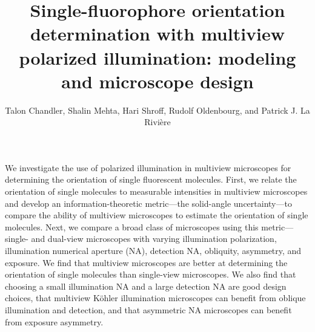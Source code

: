 \documentclass[10pt]{article}
\begin{document}
\title{Single-fluorophore orientation determination with multiview polarized
  illumination: modeling and microscope design}

\author{Talon Chandler, Shalin Mehta, Hari Shroff, Rudolf Oldenbourg, and Patrick J. La Rivi\`ere}
\address{University of Chicago, Department of Radiology, Chicago, Illinois 60637, USA\\
  Marine Biological Laboratory, Bell Center, Woods Hole, Massachusetts, USA\\
  Section on High Resolution Optical Imaging, National Institute
  of Biomedical Imaging and Bioengineering, National Institutes of Health,
  Bethesda, Maryland 20892, USA\\
  Whitman Center, Marine Biological Laboratory, Woods Hole,
  Massachusetts 02543, USA\\
  Brown University, Department of Physics, Providence, Rhode
  Island 02912, USA}

\begin{abstract*}
  We investigate the use of polarized illumination in multiview microscopes for
  determining the orientation of single fluorescent molecules. First, we relate
  the orientation of single molecules to measurable intensities in multiview
  microscopes and develop an information-theoretic metric---the solid-angle
  uncertainty---to compare the ability of multiview microscopes to estimate the
  orientation of single molecules. Next, we compare a broad class of microscopes
  using this metric---single- and dual-view microscopes with varying
  illumination polarization, illumination numerical aperture (NA), detection NA,
  obliquity, asymmetry, and exposure. We find that multiview microscopes are
  better at determining the orientation of single molecules than single-view
  microscopes. We also find that choosing a small illumination NA and a large
  detection NA are good design choices, that multiview K\"ohler illumination
  microscopes can benefit from oblique illumination and detection, and that
  asymmetric NA microscopes can benefit from exposure asymmetry.
\end{abstract*}

\end{document}
